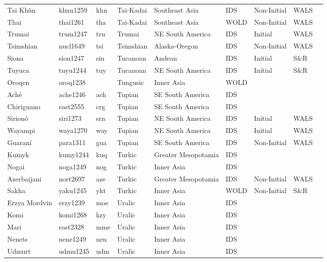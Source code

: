 \begin{longtable}{lllllllll}
  Tai Khün & khun1259 & khn & Tai-Kadai & Southeast Asia & IDS & Non-Initial & WALS &  \\ 
  Thai & thai1261 & tha & Tai-Kadai & Southeast Asia & WOLD & Non-Initial & WALS &  \\ 
  Trumai & trum1247 & tru & Trumai & NE South America & IDS & Initial & WALS &  \\ 
  Tsimshian & nucl1649 & tsi & Tsimshian & Alaska-Oregon & IDS & Non-Initial & WALS &  \\ 
  Siona & sion1247 & sin & Tucanoan & Andean & IDS & Initial & S\&R & \cite[192]{wheeler_siona2000.pdf} \\ 
  Tuyuca & tuyu1244 & tuy & Tucanoan & NE South America & IDS & Initial & S\&R & \cite[443]{barnes-malone_tuyuca2000_o.pdf} \\ 
  Oroqen & oroq1238 &  & Tungusic & Inner Asia & WOLD &  &  &  \\ 
  Aché & ache1246 & ach & Tupian & SE South America & IDS &  &  &  \\ 
  Chiriguano & east2555 & crg & Tupian & SE South America & IDS &  &  &  \\ 
  Sirionó & siri1273 & srn & Tupian & NE South America & IDS & Initial & WALS &  \\ 
  Wayampi & waya1270 & way & Tupian & NE South America & IDS & Initial & WALS &  \\ 
  Guaraní & para1311 & gua & Tupian & SE South America & IDS & Non-Initial & WALS &  \\ 
  Kumyk & kumy1244 & kuq & Turkic & Greater Mesopotamia & IDS &  &  &  \\ 
  Nogai & noga1249 & nog & Turkic & Inner Asia & IDS &  &  &  \\ 
  Azerbaijani & nort2697 & aze & Turkic & Greater Mesopotamia & IDS & Non-Initial & WALS &  \\ 
  Sakha & yaku1245 & ykt & Turkic & Inner Asia & WOLD & Non-Initial & S\&R & \cite[169]{petrova_sakha-yakut2011.pdf} \\ 
  Erzya Mordvin & erzy1239 & moe & Uralic & Inner Asia & IDS &  &  &  \\ 
  Komi & komi1268 & kzy & Uralic & Inner Asia & IDS &  &  &  \\ 
  Mari & east2328 & mme & Uralic & Inner Asia & IDS &  &  &  \\ 
  Nenets & nene1249 & nen & Uralic & Inner Asia & IDS &  &  &  \\ 
  Udmurt & udmu1245 & udm & Uralic & Inner Asia & IDS &  &  &  \\ 

\end{longtable}
